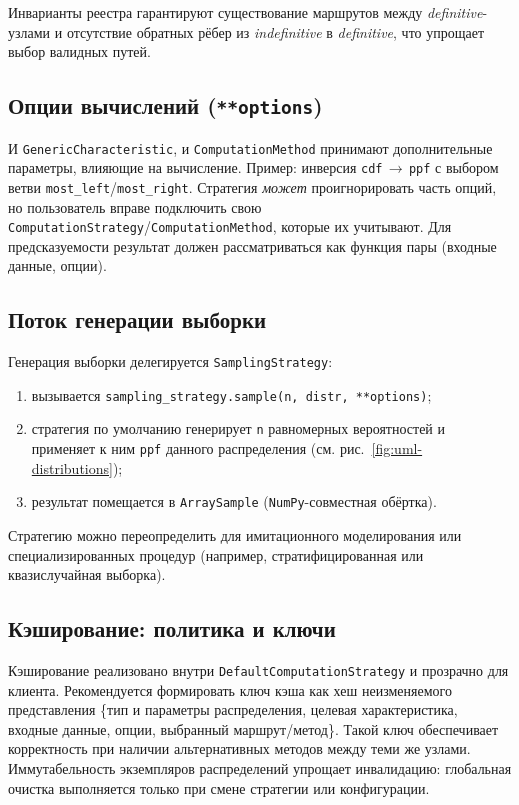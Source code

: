 Инварианты реестра гарантируют существование маршрутов между \emph{definitive}-узлами
и отсутствие обратных рёбер из \emph{indefinitive} в \emph{definitive}, что упрощает выбор валидных путей.

\subsection{Опции вычислений (\texorpdfstring{\texttt{**options}}{**options})}

И \texttt{GenericCharacteristic}, и \texttt{ComputationMethod} принимают дополнительные параметры,
влияющие на вычисление. Пример: инверсия \texttt{cdf}\,$\to$\,\texttt{ppf} с выбором ветви
\texttt{most\_left}/\texttt{most\_right}. Стратегия \emph{может} проигнорировать часть опций,
но пользователь вправе подключить свою \texttt{ComputationStrategy}/\texttt{ComputationMethod},
которые их учитывают. Для предсказуемости результат должен рассматриваться как функция пары
(входные данные, опции).

\subsection{Поток генерации выборки}

Генерация выборки делегируется \texttt{SamplingStrategy}:
\begin{enumerate}
  \item вызывается \texttt{sampling\_strategy.sample(n, distr, **options)};
  \item стратегия по умолчанию генерирует \texttt{n} равномерных вероятностей и применяет к ним \texttt{ppf}
        данного распределения (см. рис.~\ref{fig:uml-distributions});
  \item результат помещается в \texttt{ArraySample} (\texttt{NumPy}-совместная обёртка).
\end{enumerate}
Стратегию можно переопределить для имитационного моделирования или специализированных процедур
(например, стратифицированная или квазислучайная выборка).

\subsection{Кэширование: политика и ключи}

Кэширование реализовано внутри \texttt{DefaultComputationStrategy} и прозрачно для клиента.
Рекомендуется формировать ключ кэша как хеш неизменяемого представления
\{тип и параметры распределения, целевая характеристика, входные данные, опции, выбранный маршрут/метод\}.
Такой ключ обеспечивает корректность при наличии альтернативных методов между теми же узлами.
Иммутабельность экземпляров распределений упрощает инвалидацию: глобальная очистка выполняется только
при смене стратегии или конфигурации.

